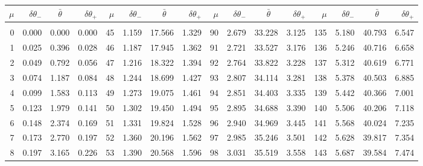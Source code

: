 \newpage
\begin{table}\centering
\small{ \begin{tabular}{rrrr|rrrr|rrrr|rrrr}
$\mu$ & $\delta\theta_-$  & $\bar{\theta}~~~~$ & $\delta\theta_+$ &
$\mu$ & $\delta\theta_-$  & $\bar{\theta}~~~~$ & $\delta\theta_+$ &
$\mu$ & $\delta\theta_-$  & $\bar{\theta}~~~~$ & $\delta\theta_+$ &
$\mu$ & $\delta\theta_-$  & $\bar{\theta}~~~~$ & $\delta\theta_+$ \\\hline
&&&&&&&&&&&&&&&\\[-1.75ex]
    0 & \tiny{  0.000} &   0.000 & \tiny{  0.000} &  45 & \tiny{  1.159} &  17.566 & \tiny{  1.329} &  90 & \tiny{  2.679} &  33.228 & \tiny{  3.125} & 135 & \tiny{  5.180} &  40.793 & \tiny{  6.547}\\
  1 & \tiny{  0.025} &   0.396 & \tiny{  0.028} &  46 & \tiny{  1.187} &  17.945 & \tiny{  1.362} &  91 & \tiny{  2.721} &  33.527 & \tiny{  3.176} & 136 & \tiny{  5.246} &  40.716 & \tiny{  6.658}\\
  2 & \tiny{  0.049} &   0.792 & \tiny{  0.056} &  47 & \tiny{  1.216} &  18.322 & \tiny{  1.394} &  92 & \tiny{  2.764} &  33.822 & \tiny{  3.228} & 137 & \tiny{  5.312} &  40.619 & \tiny{  6.771}\\
  3 & \tiny{  0.074} &   1.187 & \tiny{  0.084} &  48 & \tiny{  1.244} &  18.699 & \tiny{  1.427} &  93 & \tiny{  2.807} &  34.114 & \tiny{  3.281} & 138 & \tiny{  5.378} &  40.503 & \tiny{  6.885}\\
  4 & \tiny{  0.099} &   1.583 & \tiny{  0.113} &  49 & \tiny{  1.273} &  19.075 & \tiny{  1.461} &  94 & \tiny{  2.851} &  34.403 & \tiny{  3.335} & 139 & \tiny{  5.442} &  40.366 & \tiny{  7.001}\\
  5 & \tiny{  0.123} &   1.979 & \tiny{  0.141} &  50 & \tiny{  1.302} &  19.450 & \tiny{  1.494} &  95 & \tiny{  2.895} &  34.688 & \tiny{  3.390} & 140 & \tiny{  5.506} &  40.206 & \tiny{  7.118}\\
  6 & \tiny{  0.148} &   2.374 & \tiny{  0.169} &  51 & \tiny{  1.331} &  19.824 & \tiny{  1.528} &  96 & \tiny{  2.940} &  34.969 & \tiny{  3.445} & 141 & \tiny{  5.568} &  40.024 & \tiny{  7.235}\\
  7 & \tiny{  0.173} &   2.770 & \tiny{  0.197} &  52 & \tiny{  1.360} &  20.196 & \tiny{  1.562} &  97 & \tiny{  2.985} &  35.246 & \tiny{  3.501} & 142 & \tiny{  5.628} &  39.817 & \tiny{  7.354}\\
  8 & \tiny{  0.197} &   3.165 & \tiny{  0.226} &  53 & \tiny{  1.390} &  20.568 & \tiny{  1.596} &  98 & \tiny{  3.031} &  35.519 & \tiny{  3.558} & 143 & \tiny{  5.687} &  39.584 & \tiny{  7.474}\\

\end{tabular}}
\end{table}

